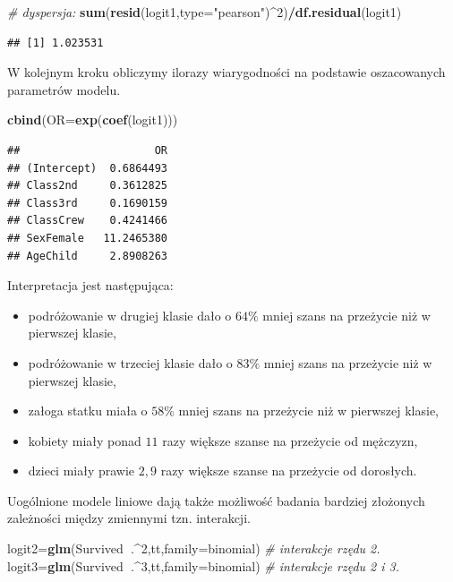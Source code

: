 \documentclass[polish,]{book}
\newenvironment{Shaded}{\begin{snugshade}}{\end{snugshade}}
\newcommand{\CommentTok}[1]{\textcolor[rgb]{0.56,0.35,0.01}{\textit{#1}}}
\newcommand{\DataTypeTok}[1]{\textcolor[rgb]{0.13,0.29,0.53}{#1}}
\newcommand{\DecValTok}[1]{\textcolor[rgb]{0.00,0.00,0.81}{#1}}
\newcommand{\KeywordTok}[1]{\textcolor[rgb]{0.13,0.29,0.53}{\textbf{#1}}}
\newcommand{\NormalTok}[1]{#1}
\newcommand{\OperatorTok}[1]{\textcolor[rgb]{0.81,0.36,0.00}{\textbf{#1}}}
\newcommand{\StringTok}[1]{\textcolor[rgb]{0.31,0.60,0.02}{#1}}
\begin{document}
\begin{Shaded}
\begin{Highlighting}[]
\CommentTok{# dyspersja:}
\KeywordTok{sum}\NormalTok{(}\KeywordTok{resid}\NormalTok{(logit1,}\DataTypeTok{type=}\StringTok{"pearson"}\NormalTok{)}\OperatorTok{^}\DecValTok{2}\NormalTok{)}\OperatorTok{/}\KeywordTok{df.residual}\NormalTok{(logit1)}
\end{Highlighting}
\end{Shaded}

\begin{verbatim}
## [1] 1.023531
\end{verbatim}

W kolejnym kroku obliczymy ilorazy wiarygodności na podstawie oszacowanych
parametrów modelu.

\begin{Shaded}
\begin{Highlighting}[]
\KeywordTok{cbind}\NormalTok{(}\DataTypeTok{OR=}\KeywordTok{exp}\NormalTok{(}\KeywordTok{coef}\NormalTok{(logit1)))}
\end{Highlighting}
\end{Shaded}

\begin{verbatim}
##                     OR
## (Intercept)  0.6864493
## Class2nd     0.3612825
## Class3rd     0.1690159
## ClassCrew    0.4241466
## SexFemale   11.2465380
## AgeChild     2.8908263
\end{verbatim}

Interpretacja jest następująca:

\begin{itemize}
\item
  podróżowanie w drugiej klasie dało o \(64\%\) mniej szans na przeżycie niż w
  pierwszej klasie,
\item
  podróżowanie w trzeciej klasie dało o \(83\%\) mniej szans na przeżycie niż w
  pierwszej klasie,
\item
  załoga statku miała o \(58\%\) mniej szans na przeżycie niż w pierwszej klasie,
\item
  kobiety miały ponad \(11\) razy większe szanse na przeżycie od mężczyzn,
\item
  dzieci miały prawie \(2,9\) razy większe szanse na przeżycie od dorosłych.
\end{itemize}

Uogólnione modele liniowe dają także możliwość badania bardziej złożonych zależności między zmiennymi tzn. interakcji.

\begin{Shaded}
\begin{Highlighting}[]
\NormalTok{logit2=}\KeywordTok{glm}\NormalTok{(Survived}\OperatorTok{~}\NormalTok{.}\OperatorTok{^}\DecValTok{2}\NormalTok{,tt,}\DataTypeTok{family=}\NormalTok{binomial) }\CommentTok{# interakcje rzędu 2.}
\NormalTok{logit3=}\KeywordTok{glm}\NormalTok{(Survived}\OperatorTok{~}\NormalTok{.}\OperatorTok{^}\DecValTok{3}\NormalTok{,tt,}\DataTypeTok{family=}\NormalTok{binomial) }\CommentTok{# interakcje rzędu 2 i 3.}
\end{Highlighting}
\end{Shaded}
\end{document}

